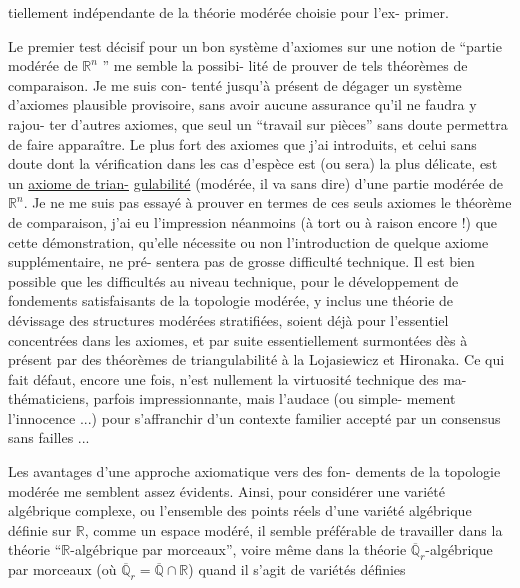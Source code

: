 
tiellement indépendante de la théorie modérée choisie pour l'ex-%
primer.

Le premier test décisif pour un bon système d'axiomes
sur une notion de ``partie modérée de $\mathbb{R}^n$ '' me semble la possibi-%
lité de prouver de tels théorèmes de comparaison. Je me suis con-%
tenté jusqu'à présent de dégager un système d'axiomes plausible
provisoire, sans avoir aucune assurance qu'il ne faudra y rajou-%
ter d'autres axiomes, que seul un ``travail sur pièces'' sans doute
permettra de faire apparaître. Le plus fort des axiomes que j'ai
introduits, et celui sans doute dont la vérification dans les cas
d'espèce est (ou sera) la plus délicate, est un \uline{axiome de trian-}%
\uline{gulabilité} (modérée, il va sans dire) d'une partie modérée de $\mathbb{R}^n$.
Je ne me suis pas essayé à prouver en termes de ces seuls axiomes
le théorème de comparaison, j'ai eu l'impression néanmoins (à tort
ou à raison encore !) que cette démonstration, qu'elle nécessite
ou non l'introduction de quelque axiome supplémentaire, ne pré-%
sentera pas de grosse difficulté technique. Il est bien possible
que les difficultés au niveau technique, pour le développement
de fondements satisfaisants de la topologie modérée, y inclus une
théorie de dévissage des structures modérées stratifiées, soient
déjà pour l'essentiel concentrées dans les axiomes, et par suite
essentiellement surmontées dès à présent par des théorèmes de
triangulabilité à la Lojasiewicz et Hironaka. Ce qui fait défaut,
encore une fois, n'est nullement la virtuosité technique des ma-%
thématiciens, parfois impressionnante, mais l'audace (ou simple-%
mement l'innocence ...) pour s'affranchir d'un contexte familier
accepté par un consensus sans failles ...

Les avantages d'une approche axiomatique vers des fon-%
dements de la topologie modérée me semblent assez évidents. Ainsi,
pour considérer une variété algébrique complexe, ou l'ensemble des
points réels d'une variété algébrique définie sur $\mathbb{R}$, comme un
espace modéré, il semble préférable de travailler dans la théorie
``$\mathbb{R}$-algébrique par morceaux'', voire même dans la théorie $\overline{\mathbb{Q}}_r$-algébrique
par morceaux (où $\overline{\mathbb{Q}}_r = \overline{\mathbb{Q}} \cap \mathbb{R}$) quand il s'agit de variétés définies

